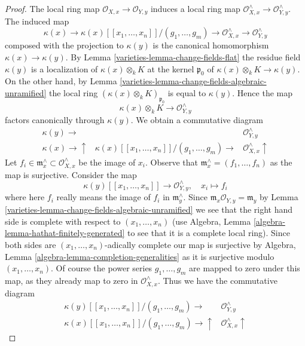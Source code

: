 \begin{proof}

The local ring map $\mathcal{O}_{X, x} \to \mathcal{O}_{Y, y}$
induces a local ring map
$\mathcal{O}_{X, x}^\wedge \to \mathcal{O}_{Y, y}^\wedge$.
The induced map
$$
\kappa(x) \to \kappa(x)[[x_1, \ldots, x_n]]/(g_1, \ldots, g_m)
\to \mathcal{O}_{X, x}^\wedge \to \mathcal{O}_{Y, y}^\wedge
$$
composed with the projection to $\kappa(y)$ is the canonical
homomorphism $\kappa(x) \to \kappa(y)$.
By Lemma \ref{varieties-lemma-change-fields-flat} the residue field
$\kappa(y)$ is a localization of $\kappa(x) \otimes_k K$
at the kernel $\mathfrak p_0$ of $\kappa(x) \otimes_k K \to \kappa(y)$.
On the other hand, by Lemma \ref{varieties-lemma-change-fields-algebraic-unramified}
the local ring $(\kappa(x) \otimes_k K)_{\mathfrak p_0}$
is equal to $\kappa(y)$. Hence the map
$$
\kappa(x) \otimes_k K \to \mathcal{O}_{Y, y}^\wedge
$$
factors canonically through $\kappa(y)$. We obtain a commutative
diagram
$$
\begin{array}{ccc}\kappa(y) \longrightarrow &  & \mathcal{O}_{Y, y}^\wedge \\ \kappa(x) \longrightarrow\uparrow & \kappa(x)[[x_1, \ldots, x_n]]/(g_1, \ldots, g_m) \longrightarrow & \mathcal{O}_{X, x}^\wedge \uparrow\end{array}
$$
Let $f_i \in \mathfrak m_x^\wedge \subset \mathcal{O}_{X, x}^\wedge$
be the image of $x_i$. Observe that
$\mathfrak  m_x^\wedge = (f_1, \ldots, f_n)$ as the map is surjective.
Consider the map
$$
\kappa(y)[[x_1, \ldots, x_n]] \longrightarrow \mathcal{O}_{Y, y}^\wedge,\quad
x_i \longmapsto f_i
$$
where here $f_i$ really means the image of $f_i$ in $\mathfrak m_y^\wedge$.
Since $\mathfrak m_x \mathcal{O}_{Y, y} = \mathfrak m_y$
by Lemma \ref{varieties-lemma-change-fields-algebraic-unramified}
we see that the right hand side is complete with respect to
$(x_1, \ldots, x_n)$ (use Algebra, Lemma
\ref{algebra-lemma-hathat-finitely-generated} to see that
it is a complete local ring).
Since both sides are $(x_1, \ldots, x_n)$-adically complete
our map is surjective by
Algebra, Lemma \ref{algebra-lemma-completion-generalities}
as it is surjective modulo $(x_1, \ldots, x_n)$.
Of course the power series $g_1, \ldots, g_m$
are mapped to zero under this map, as they already map to zero
in $\mathcal{O}_{X, x}^\wedge$. Thus we have the commutative diagram
$$
\begin{array}{cc}\kappa(y)[[x_1, \ldots, x_n]]/(g_1, \ldots, g_m) \longrightarrow & \mathcal{O}_{Y, y}^\wedge \\ \kappa(x)[[x_1, \ldots, x_n]]/(g_1, \ldots, g_m) \longrightarrow\uparrow & \mathcal{O}_{X, x}^\wedge \uparrow\end{array}
$$
\end{proof}
